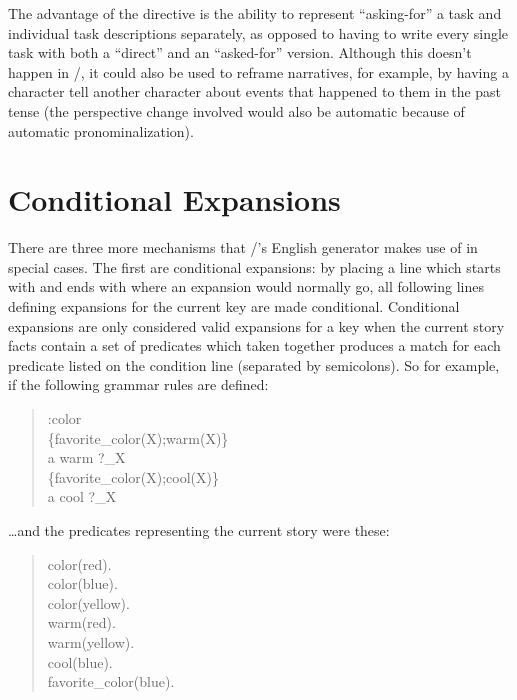 The advantage of the  directive is the ability to represent ``asking-for'' a task and individual task descriptions separately, as opposed to having to write every single task with both a ``direct'' and an ``asked-for'' version.
%
Although this doesn't happen in \dunyazad/, it could also be used to reframe narratives, for example, by having a character tell another character about events that happened to them in the past tense (the perspective change involved would also be automatic because of automatic pronominalization). 


\section{Conditional Expansions}

There are three more mechanisms that \dunyazad/'s English generator makes use of in special cases.
%
The first are conditional expansions: by placing a line which starts with \exchar{\{} and ends with \exchar{\}} where an expansion would normally go, all following lines defining expansions for the current key are made conditional.
%
Conditional expansions are only considered valid expansions for a key when the current story facts contain a set of predicates which taken together produces a match for each predicate listed on the condition line (separated by semicolons).
%
So for example, if the following grammar rules are defined:

\begin{quote}
  \ttfamily
  :color \\
  \{favorite\_color(X);warm(X)\} \\
  a warm ?\_X \\
  \{favorite\_color(X);cool(X)\} \\
  a cool ?\_X
\end{quote}

\noindent \ldots and the predicates representing the current story were these:

\begin{quote}
  \ttfamily
  color(red). \\
  color(blue). \\
  color(yellow). \\
  warm(red). \\
  warm(yellow). \\
  cool(blue). \\
  favorite\_color(blue).
\end{quote}

